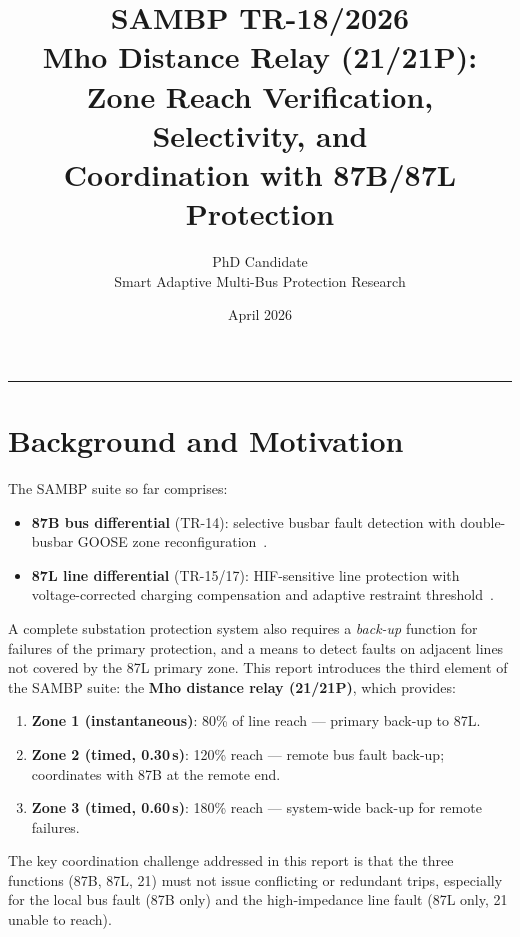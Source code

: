 \documentclass[11pt, a4paper]{article}
\title{\textbf{SAMBP TR-18/2026}\\[4pt]
       \large Mho Distance Relay (21/21P):\\
       Zone Reach Verification, Selectivity, and\\
       Coordination with 87B/87L Protection}
\author{PhD Candidate\\[2pt]
        \small Smart Adaptive Multi-Bus Protection Research}
\date{April 2026}
\begin{document}
\maketitle
\tableofcontents
\vspace{6pt}\hrule\vspace{10pt}

\section{Background and Motivation}
\label{sec:background}

The SAMBP suite so far comprises:
\begin{itemize}
  \item \textbf{87B bus differential} (TR-14): selective busbar fault detection
        with double-busbar GOOSE zone reconfiguration~\cite{SAMBP_TR16}.
  \item \textbf{87L line differential} (TR-15/17): HIF-sensitive line
        protection with voltage-corrected charging compensation and
        adaptive restraint threshold~\cite{SAMBP_TR15,SAMBP_TR17}.
\end{itemize}

A complete substation protection system also requires a \emph{back-up}
function for failures of the primary protection, and a means to detect faults
on adjacent lines not covered by the 87L primary zone.  This report
introduces the third element of the SAMBP suite: the \textbf{Mho distance
relay (21/21P)}, which provides:

\begin{enumerate}
  \item \textbf{Zone 1 (instantaneous)}: 80\% of line reach — primary
        back-up to 87L.
  \item \textbf{Zone 2 (timed, 0.30\,s)}: 120\% reach — remote bus
        fault back-up; coordinates with 87B at the remote end.
  \item \textbf{Zone 3 (timed, 0.60\,s)}: 180\% reach — system-wide
        back-up for remote failures.
\end{enumerate}

The key coordination challenge addressed in this report is that the three
functions (87B, 87L, 21) must not issue conflicting or redundant trips,
especially for the local bus fault (87B only) and the high-impedance line
fault (87L only, 21 unable to reach).


\end{document}
